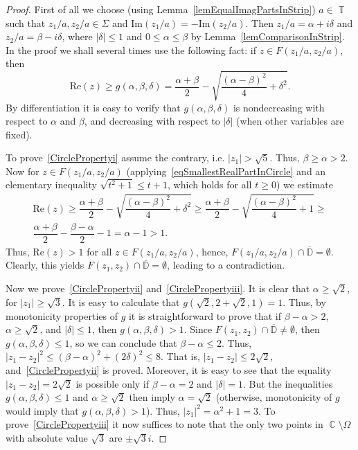 \documentclass{amsart}
\numberwithin{equation}{section}
\theoremstyle{definition}
\theoremstyle{remark}
\DeclareMathOperator{\CC}{\mathbb C}
\DeclareMathOperator{\TT}{\mathbb T}
\begin{document}
	\begin{proof}
		First of all we choose (using Lemma~\ref{lemEqualImagPartsInStrip}) $a \in \TT$ such that $z_1/a, z_2/a \in \Sigma$ and $\mathrm{Im}(z_1/a) = -\mathrm{Im}(z_2/a)$. Then $z_1/a = \alpha + i\delta$ and $z_2/a = \beta - i\delta$, where $|\delta| \le 1$ and $0 \le \alpha \le \beta$ by Lemma~\ref{lemComparisonInStrip}. In the proof we shall several times use the following fact: if $z \in F(z_1/a, z_2/a)$, then
		\begin{equation}\label{eqSmallestRealPartInCircle}
			\mathrm{Re}(z) \ge g(\alpha, \beta, \delta) = \dfrac{\alpha+ \beta}{2} - \sqrt{\dfrac{(\alpha - \beta)^2}{4} + \delta^2}.
		\end{equation}
		By differentiation it is easy to verify that $g(\alpha, \beta, \delta)$ is nondecreasing with respect to $\alpha$ and $\beta$, and decreasing with respect to $|\delta|$ (when other variables are fixed).
		
		To prove~\ref{CirclePropertyi} assume the contrary, i.e. $|z_1| > \sqrt{5}$. Thus, $\beta \ge \alpha > 2$. Now for $z \in F(z_1/a, z_2/a)$ (applying~\eqref{eqSmallestRealPartInCircle} and an elementary inequality $\sqrt{t^2 + 1} \le t + 1$, which holds for all $t \ge 0$) we estimate
		\begin{multline*}
			\mathrm{Re}(z) \ge \dfrac{\alpha+ \beta}{2} - \sqrt{\dfrac{(\alpha - \beta)^2}{4} + \delta^2} \ge \dfrac{\alpha+ \beta}{2} - \sqrt{\dfrac{(\alpha - \beta)^2}{4} + 1} \ge \\ \dfrac{\alpha+ \beta}{2} - \dfrac{\beta - \alpha}{2} - 1 = \alpha - 1 > 1.
		\end{multline*}
		Thus, $\mathrm{Re}(z) > 1$ for all $z \in F(z_1/a, z_2/a)$, hence, $F(z_1/a, z_2/a) \cap \overline{\mathbb D} = \emptyset$. Clearly, this yields $F(z_1, z_2) \cap \overline{\mathbb D} = \emptyset$, leading to a contradiction.
		
		Now we prove~\ref{CirclePropertyii} and~\ref{CirclePropertyiii}. It is clear that $\alpha \ge \sqrt{2}$, for $|z_1| \ge \sqrt{3}$. It is easy to calculate that $g(\sqrt{2}, 2 + \sqrt{2}, 1) = 1$. Thus, by monotonicity properties of $g$ it is straightforward to prove that if $\beta - \alpha > 2$, $\alpha \ge \sqrt{2}$, and $|\delta| \le 1$, then $g(\alpha, \beta, \delta) > 1$. Since $F(z_1, z_2) \cap \overline{\mathbb D} \ne \emptyset$, then $g(\alpha, \beta, \delta) \le 1$, so we can conclude that $\beta - \alpha \le 2$. Thus, $|z_1 - z_2|^2 \le (\beta - \alpha)^2 + (2\delta)^2 \le 8$. That is, $|z_1 - z_2| \le 2\sqrt{2}$, and~\ref{CirclePropertyii} is proved. Moreover, it is easy to see that the equality $|z_1 - z_2| = 2\sqrt{2}$ is possible only if $\beta - \alpha = 2$ and $|\delta| = 1$. But the inequalities $g(\alpha, \beta, \delta) \le 1$ and $\alpha \ge \sqrt{2}$ then imply $\alpha = \sqrt{2}$ (otherwise, monotonicity of $g$ would imply that $g(\alpha, \beta, \delta) > 1$). Thus, $|z_1|^2 = \alpha^2 + 1 = 3$. To prove~\ref{CirclePropertyiii} it now suffices to note that the only two points in $\CC \setminus \Omega$ with absolute value $\sqrt{3}$ are $\pm\sqrt{3}i$.
		

\end{proof}
\end{document}
